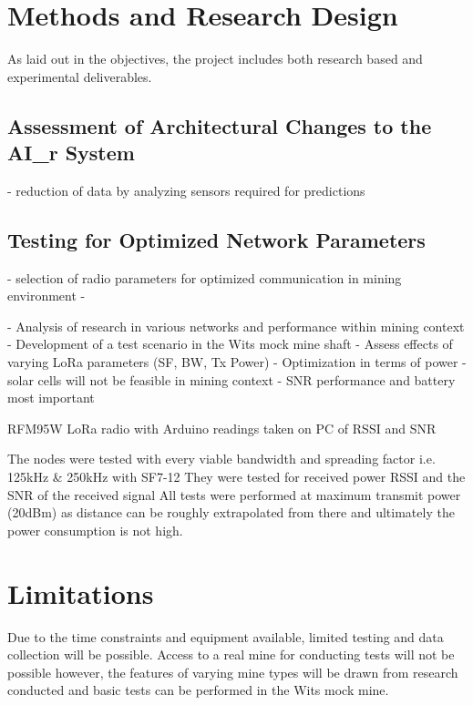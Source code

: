 \documentclass[a4paper,twoside,12pt]{report}
\begin{document}
\section{Methods and Research Design}
As laid out in the objectives, the project includes both research based and experimental deliverables.

\subsection{Assessment of Architectural Changes to the AI\_r System}
- reduction of data by analyzing sensors required for predictions

\subsection{Testing for Optimized Network Parameters}
- selection of radio parameters for optimized communication in mining environment
- 

- Analysis of research in various networks and performance within mining context
- Development of a test scenario in the Wits mock mine shaft
- Assess effects of varying LoRa parameters (SF, BW, Tx Power)
- Optimization in terms of power - solar cells will not be feasible in mining context
- SNR performance and battery most important

RFM95W LoRa radio with Arduino readings taken on PC of RSSI and SNR

The nodes were tested with every viable bandwidth and spreading factor i.e. 125kHz & 250kHz with SF7-12
They were tested for received power RSSI and the SNR of the received signal
All tests were performed at maximum transmit power (20dBm) as distance can be roughly extrapolated from there and ultimately the power consumption is not high.


\section{Limitations}
Due to the time constraints and equipment available, limited testing and data collection will be possible.
Access to a real mine for conducting tests will not be possible however, the features of varying mine types will be drawn from research conducted and basic tests can be performed in the Wits mock mine.
\newline
\end{document}
